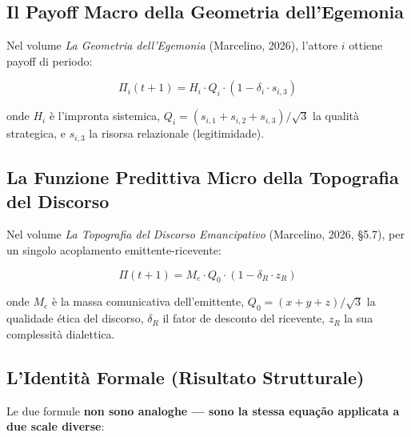 \subsection{Il Payoff Macro della Geometria
dell'Egemonia}\label{il-payoff-macro-della-geometria-dellegemonia}

Nel volume \emph{La Geometria dell'Egemonia} (Marcelino, 2026), l'attore
\(i\) ottiene payoff di periodo:

\[
\Pi_i(t+1) = H_i \cdot Q_i \cdot (1 - \delta_i \cdot s_{i,3})
\]

onde \(H_i\) è l'impronta sistemica,
\(Q_i = (s_{i,1}+s_{i,2}+s_{i,3})/\sqrt{3}\) la qualità strategica, e
\(s_{i,3}\) la risorsa relazionale (legitimidade).

\subsection{La Funzione Predittiva Micro della Topografia del
Discorso}\label{la-funzione-predittiva-micro-della-topografia-del-discorso}

Nel volume \emph{La Topografia del Discorso Emancipativo} (Marcelino,
2026, \S{}5.7), per un singolo acoplamento emittente-ricevente:

\[
\Pi(t+1) = M_e \cdot Q_0 \cdot (1 - \delta_R \cdot z_R)
\]

onde \(M_e\) è la massa comunicativa dell'emittente,
\(Q_0 = (x+y+z)/\sqrt{3}\) la qualidade ética del discorso, \(\delta_R\)
il fator de desconto del ricevente, \(z_R\) la sua complessità
dialettica.

\subsection{\texorpdfstring{\Proved{} L'Identità Formale (Risultato
Strutturale)}{ L'Identità Formale (Risultato Strutturale)}}\label{lidentituxe0-formale-risultato-estrutural}

Le due formule \textbf{non sono analoghe --- sono la stessa equação
applicata a due scale diverse}:

